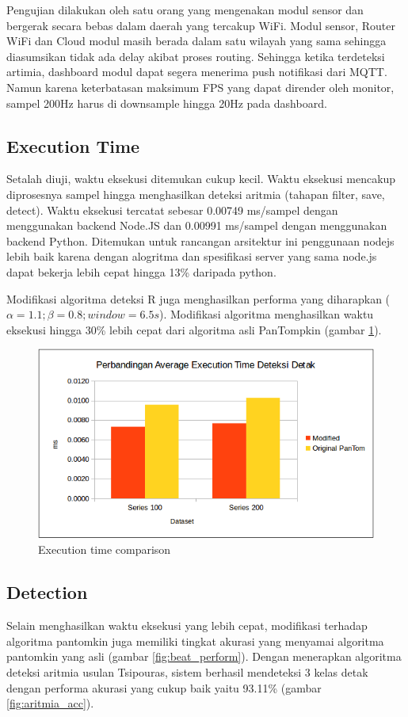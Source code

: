 \documentclass[conference]{IEEEtran}
\begin{document}
Pengujian dilakukan oleh satu orang yang mengenakan modul sensor dan bergerak secara bebas dalam daerah yang tercakup WiFi. Modul sensor, Router WiFi dan Cloud modul masih berada dalam satu wilayah yang sama sehingga diasumsikan tidak ada delay akibat proses routing. Sehingga ketika terdeteksi artimia, dashboard modul dapat segera menerima push notifikasi dari MQTT. Namun karena keterbatasan maksimum FPS yang dapat dirender oleh monitor, sampel 200Hz harus di downsample hingga 20Hz pada dashboard.

\subsection{Execution Time}
Setalah diuji, waktu eksekusi ditemukan cukup kecil. Waktu eksekusi mencakup diprosesnya sampel hingga menghasilkan deteksi aritmia (tahapan filter, save, detect). Waktu eksekusi tercatat sebesar 0.00749 ms/sampel dengan menggunakan backend Node.JS dan 0.00991 ms/sampel dengan menggunakan backend Python. Ditemukan untuk rancangan arsitektur ini penggunaan nodejs lebih baik karena dengan alogritma dan spesifikasi server yang sama node.js dapat bekerja lebih cepat hingga 13\% daripada python.

Modifikasi algoritma deteksi R juga menghasilkan performa yang diharapkan ($\alpha = 1.1; \beta = 0.8; window = 6.5s$). Modifikasi algoritma menghasilkan waktu eksekusi hingga 30\% lebih cepat dari algoritma asli PanTompkin (gambar \ref{fig:exec_time}). 

\begin{figure}[htbp]
\centerline{\includegraphics[scale=0.41]{images/beat_exec.png}}
\caption{Execution time comparison}
\label{fig:exec_time}
\end{figure}

\subsection{Detection}
Selain menghasilkan waktu eksekusi yang lebih cepat, modifikasi terhadap algoritma pantomkin juga memiliki tingkat akurasi yang menyamai algoritma pantomkin yang asli (gambar \ref{fig:beat_perform}). Dengan menerapkan algoritma deteksi aritmia usulan Tsipouras, sistem berhasil mendeteksi 3 kelas detak dengan performa akurasi yang cukup baik yaitu 93.11\% (gambar \ref{fig:aritmia_acc}).
\end{document}
